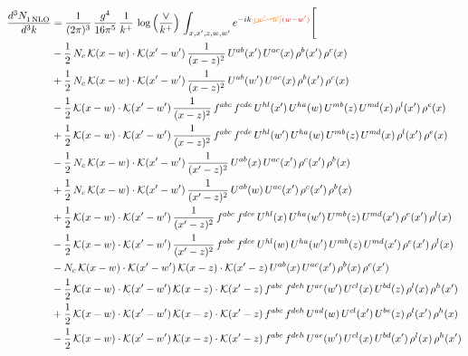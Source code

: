 \documentclass[9pt]{article}
\numberwithin{equation}{section}
\begin{document}
\begin{align}
\frac{d^{3}N_{1\,\rm NLO}^{\rm}}{d^{3}k}  & = \frac{1}{(2\pi)^{3}}\,\frac{g^{4}}{16\pi^{5}}\,\frac{1}{k^{+}}\,\log{\left(\frac{\vee}{k^{+}}\right)}\, \int_{x,x',z,w,w'}e^{-ik\cdot{\color{orange}\cancel{(w'-w)}}{\color{red}(w-w')}}\Bigg[\notag\\ &
-\frac{1}{2}\,N_{c}\,\mathcal{K}(x-w)\cdot\mathcal{K}(x'-w')\,\frac{1}{(x-z)^{2}}\,U^{ab}(x')\,U^{ac}(x)\,\rho^{b}(x')\,\rho^{c}(x)\notag\\
&+\frac{1}{2}\,N_{c}\,\mathcal{K}(x-w)\cdot\mathcal{K}(x'-w')\,\frac{1}{(x-z)^{2}}\,U^{ab}(w')\,U^{ac}(x)\,\rho^{b}(x')\,\rho^{c}(x)\notag\\
&-\frac{1}{2}\,\mathcal{K}(x-w)\cdot\mathcal{K}(x'-w')\,\frac{1}{(x-z)^{2}}\,f^{abc}\,f^{cde}\,U^{hl}(x')\,U^{ha}(w)\,U^{mb}(z)\,U^{md}(x)\,\rho^{l}(x')\,\rho^{e}(x)\notag\\
&+\frac{1}{2}\,\mathcal{K}(x-w)\cdot\mathcal{K}(x'-w')\,\frac{1}{(x-z)^{2}}\,f^{abc}\,f^{cde}\,U^{hl}(w')\,U^{ha}(w)\,U^{mb}(z)\,U^{md}(x)\,\rho^{l}(x')\,\rho^{e}(x)\notag\\
&-\frac{1}{2}\,N_{c}\,\mathcal{K}(x-w)\cdot\mathcal{K}(x'-w')\,\frac{1}{(x'-z)^{2}}\,U^{ab}(x)\,U^{ac}(x')\,\rho^{c}(x')\,\rho^{b}(x)\notag\\
&+\frac{1}{2}\,N_{c}\,\mathcal{K}(x-w)\cdot\mathcal{K}(x'-w')\,\frac{1}{(x'-z)^{2}}\,U^{ab}(w)\,U^{ac}(x')\,\rho^{c}(x')\,\rho^{b}(x)\notag\\
&+\frac{1}{2}\,\mathcal{K}(x-w)\cdot\mathcal{K}(x'-w')\,\frac{1}{(x'-z)^{2}}\,f^{abc}\,f^{dce}\,U^{hl}(x)\,U^{ha}(w')\,U^{mb}(z)\,U^{md}(x')\,\rho^{e}(x')\,\rho^{l}(x)\notag\\
&-\frac{1}{2}\,\mathcal{K}(x-w)\cdot\mathcal{K}(x'-w')\,\frac{1}{(x'-z)^{2}}\,f^{abc}\,f^{dce}\,U^{hl}(w)\,U^{ha}(w')\,U^{mb}(z)\,U^{md}(x')\,\rho^{e}(x')\,\rho^{l}(x)\notag\\
&-N_{c}\,\mathcal{K}(x-w)\cdot\mathcal{K}(x'-w')\,\mathcal{K}(x-z)\cdot\mathcal{K}(x'-z)\,U^{ab}(x)\,U^{ac}(x')\,\rho^{b}(x)\,\rho^{c}(x')\notag\\
&-\frac{1}{2}\,\mathcal{K}(x-w)\cdot\mathcal{K}(x'-w')\,\mathcal{K}(x-z)\cdot\mathcal{K}(x'-z)\,f^{abc}\,f^{deh}\,U^{ae}(w')\,U^{cl}(x)\,U^{bd}(z)\,\rho^{l}(x)\,\rho^{h}(x')\notag\\
&+\frac{1}{2}\,\mathcal{K}(x-w)\cdot\mathcal{K}(x'-w')\,\mathcal{K}(x-z)\cdot\mathcal{K}(x'-z)\,f^{abc}\,f^{deh}\,U^{ad}(w)\,U^{cl}(x')\,U^{be}(z)\,\rho^{l}(x')\,\rho^{h}(x)\notag\\
&-\frac{1}{2}\,\mathcal{K}(x-w)\cdot\mathcal{K}(x'-w')\,\mathcal{K}(x-z)\cdot\mathcal{K}(x'-z)\,f^{abc}\,f^{deh}\,U^{ae}(w')\,U^{cl}(x)\,U^{bd}(x')\,\rho^{l}(x)\,\rho^{h}(x')\notag\\

\end{align}
\end{document}
